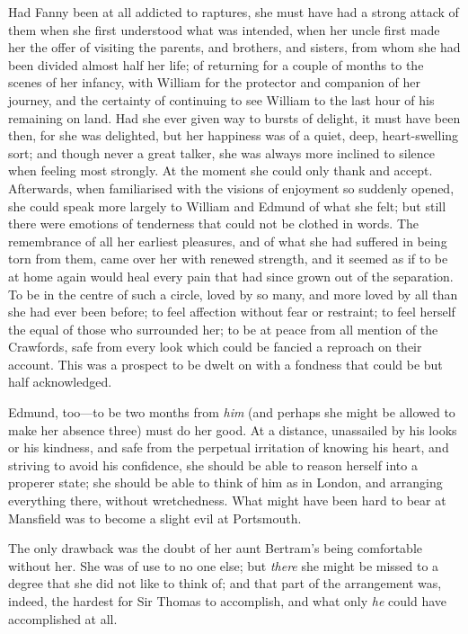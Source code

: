 Had Fanny been at all addicted to raptures, she must have
had a strong attack of them when she first understood
what was intended, when her uncle first made her the offer
of visiting the parents, and brothers, and sisters,
from whom she had been divided almost half her life;
of returning for a couple of months to the scenes of
her infancy, with William for the protector and companion
of her journey, and the certainty of continuing to see
William to the last hour of his remaining on land.
Had she ever given way to bursts of delight, it must have
been then, for she was delighted, but her happiness was
of a quiet, deep, heart-swelling sort; and though never
a great talker, she was always more inclined to silence
when feeling most strongly.  At the moment she could
only thank and accept.  Afterwards, when familiarised
with the visions of enjoyment so suddenly opened, she could
speak more largely to William and Edmund of what she felt;
but still there were emotions of tenderness that could
not be clothed in words.  The remembrance of all her
earliest pleasures, and of what she had suffered in being
torn from them, came over her with renewed strength,
and it seemed as if to be at home again would heal
every pain that had since grown out of the separation.
To be in the centre of such a circle, loved by so many,
and more loved by all than she had ever been before;
to feel affection without fear or restraint; to feel
herself the equal of those who surrounded her; to be at
peace from all mention of the Crawfords, safe from every
look which could be fancied a reproach on their account.
This was a prospect to be dwelt on with a fondness that could
be but half acknowledged.

Edmund, too---to be two months from \emph{him} (and perhaps
she might be allowed to make her absence three)
must do her good.  At a distance, unassailed by his looks
or his kindness, and safe from the perpetual irritation
of knowing his heart, and striving to avoid his confidence,
she should be able to reason herself into a properer state;
she should be able to think of him as in London,
and arranging everything there, without wretchedness.
What might have been hard to bear at Mansfield was to become
a slight evil at Portsmouth.

The only drawback was the doubt of her aunt Bertram's being
comfortable without her.  She was of use to no one else;
but \emph{there} she might be missed to a degree that she did
not like to think of; and that part of the arrangement
was, indeed, the hardest for Sir Thomas to accomplish,
and what only \emph{he} could have accomplished at all.

